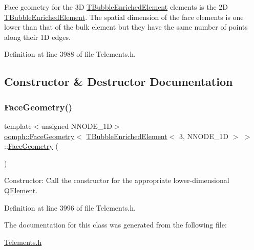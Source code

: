Face geometry for the 3D \hyperlink{classoomph_1_1TBubbleEnrichedElement}{T\+Bubble\+Enriched\+Element} elements is the 2D \hyperlink{classoomph_1_1TBubbleEnrichedElement}{T\+Bubble\+Enriched\+Element}. The spatial dimension of the face elements is one lower than that of the bulk element but they have the same number of points along their 1D edges. 

Definition at line 3988 of file Telements.\+h.



\subsection{Constructor \& Destructor Documentation}
\mbox{\label{classoomph_1_1FaceGeometry_3_01TBubbleEnrichedElement_3_013_00_01NNODE__1D_01_4_01_4_a53264b6a17821644b1c1a910678152ff}} 
\subsubsection{\texorpdfstring{Face\+Geometry()}{FaceGeometry()}}
{\footnotesize\ttfamily template$<$unsigned N\+N\+O\+D\+E\+\_\+1D$>$ \\
\hyperlink{classoomph_1_1FaceGeometry}{oomph\+::\+Face\+Geometry}$<$ \hyperlink{classoomph_1_1TBubbleEnrichedElement}{T\+Bubble\+Enriched\+Element}$<$ 3, N\+N\+O\+D\+E\+\_\+1D $>$ $>$\+::\hyperlink{classoomph_1_1FaceGeometry}{Face\+Geometry} (\begin{DoxyParamCaption}{ }\end{DoxyParamCaption})\hspace{0.3cm}{\ttfamily [inline]}}



Constructor\+: Call the constructor for the appropriate lower-\/dimensional \hyperlink{classoomph_1_1QElement}{Q\+Element}. 



Definition at line 3996 of file Telements.\+h.



The documentation for this class was generated from the following file\+:\begin{DoxyCompactItemize}
\item 
\hyperlink{Telements_8h}{Telements.\+h}\end{DoxyCompactItemize}
